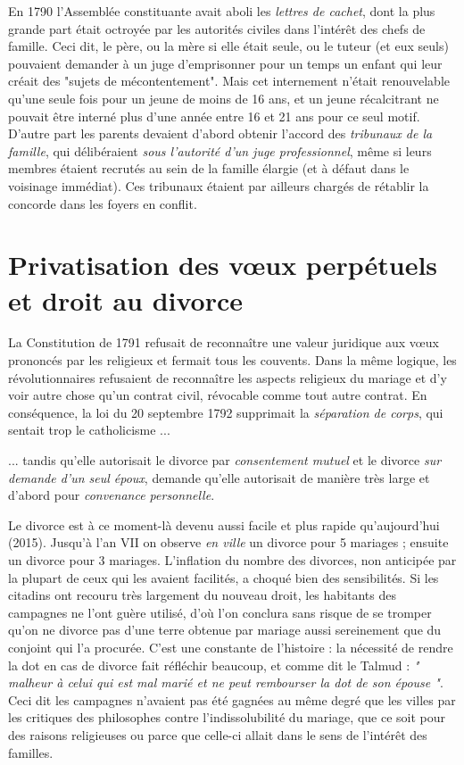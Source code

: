  En 1790 l'Assemblée constituante avait aboli les \emph{lettres de cachet}, dont la plus grande part était octroyée par les autorités civiles dans l'intérêt des chefs de famille. Ceci dit, le père, ou la mère si elle était seule, ou le tuteur (et eux seuls) pouvaient demander à un juge d'emprisonner pour un temps un enfant qui leur créait des "sujets de mécontentement". Mais cet internement n'était renouvelable qu'une seule fois pour un jeune de moins de 16 ans, et un jeune récalcitrant ne pouvait être interné plus d'une année entre 16 et 21 ans pour ce seul motif. D'autre part les parents devaient d'abord obtenir l'accord des \emph{tribunaux de la famille}, qui délibéraient \emph{sous l'autorité d'un juge professionnel}, même si leurs membres étaient recrutés au sein de la famille élargie (et à défaut dans le voisinage immédiat). Ces tribunaux étaient par ailleurs chargés de rétablir la concorde dans les foyers en conflit. 


\section{Privatisation des vœux perpétuels et droit au divorce}

 La Constitution de 1791 refusait de reconnaître une valeur juridique aux vœux prononcés par les religieux et fermait tous les couvents. Dans la même logique, les révolutionnaires refusaient de reconnaître les aspects religieux du mariage et d'y voir autre chose qu'un contrat civil, révocable comme tout autre contrat. En conséquence, la loi du 20 septembre 1792 supprimait la \emph{séparation de corps}, qui sentait trop le catholicisme ...

 ... tandis qu'elle autorisait le divorce par \emph{consentement mutuel} et le divorce \emph{sur demande d'un seul époux}, demande qu'elle autorisait de manière très large et d'abord pour \emph{convenance personnelle}. 

 Le divorce est à ce moment-là devenu aussi facile et plus rapide qu'aujourd'hui (2015). Jusqu'à l'an VII on observe \emph{en ville} un divorce pour 5 mariages ; ensuite un divorce pour 3 mariages. L'inflation du nombre des divorces, non anticipée par la plupart de ceux qui les avaient facilités, a choqué bien des sensibilités. Si les citadins ont recouru très largement du nouveau droit, les habitants des campagnes ne l'ont guère utilisé, d'où l'on conclura sans risque de se tromper qu'on ne divorce pas d'une terre obtenue par mariage aussi sereinement que du conjoint qui l'a procurée. C'est une constante de l'histoire : la nécessité de rendre la dot en cas de divorce fait réfléchir beaucoup, et comme dit le Talmud : \emph{" malheur à celui qui est mal marié et ne peut rembourser la dot de son épouse "}. Ceci dit les campagnes n'avaient pas été gagnées au même degré que les villes par les critiques des philosophes contre l'indissolubilité du mariage, que ce soit pour des raisons religieuses ou parce que celle-ci allait dans le sens de l'intérêt des familles. 

